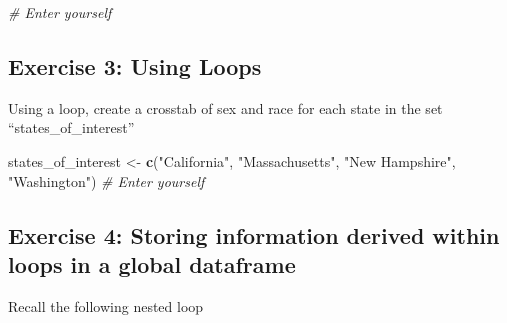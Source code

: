 \documentclass[]{book}
\newenvironment{Shaded}{\begin{snugshade}}{\end{snugshade}}
\newcommand{\CommentTok}[1]{\textcolor[rgb]{0.56,0.35,0.01}{\textit{#1}}}
\newcommand{\KeywordTok}[1]{\textcolor[rgb]{0.13,0.29,0.53}{\textbf{#1}}}
\newcommand{\NormalTok}[1]{#1}
\newcommand{\StringTok}[1]{\textcolor[rgb]{0.31,0.60,0.02}{#1}}
\theoremstyle{definition}
\theoremstyle{definition}
\theoremstyle{definition}
\theoremstyle{remark}
\begin{document}
\begin{Shaded}
\begin{Highlighting}[]
\begin{Shaded}
\begin{Highlighting}[]
\begin{Shaded}
\begin{Highlighting}[]
\begin{Shaded}
\begin{Highlighting}[]
\CommentTok{# Enter yourself}
\end{Highlighting}
\end{Shaded}

\hypertarget{exercise-3-using-loops}{%
\subsection*{Exercise 3: Using Loops}\label{exercise-3-using-loops}}

Using a loop, create a crosstab of sex and race for each state in the set ``states\_of\_interest''

\begin{Shaded}
\begin{Highlighting}[]
\NormalTok{states_of_interest <-}\StringTok{ }\KeywordTok{c}\NormalTok{(}\StringTok{"California"}\NormalTok{, }\StringTok{"Massachusetts"}\NormalTok{, }\StringTok{"New Hampshire"}\NormalTok{, }\StringTok{"Washington"}\NormalTok{)}
\CommentTok{# Enter yourself}
\end{Highlighting}
\end{Shaded}

\hypertarget{exercise-4-storing-information-derived-within-loops-in-a-global-dataframe}{%
\subsection*{Exercise 4: Storing information derived within loops in a global dataframe}\label{exercise-4-storing-information-derived-within-loops-in-a-global-dataframe}}

Recall the following nested loop


\end{Highlighting}
\end{Shaded}
\end{Highlighting}
\end{Shaded}
\end{Highlighting}
\end{Shaded}
\end{document}
